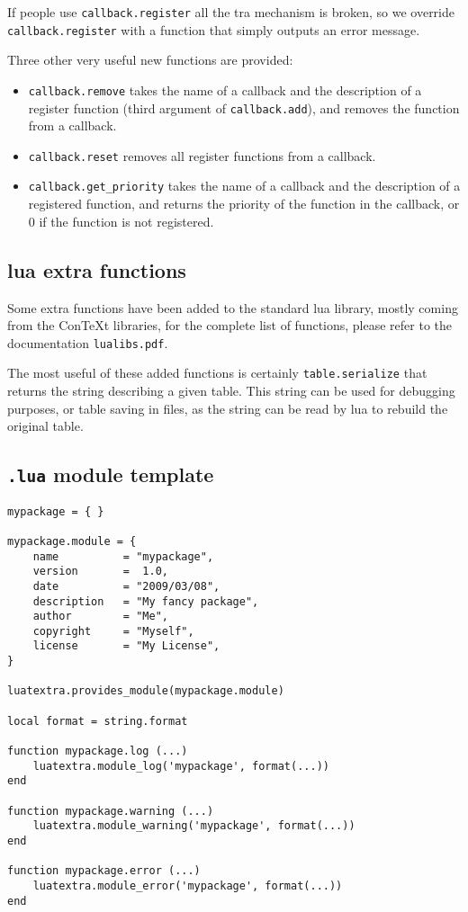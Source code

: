 \documentclass{article}
\begin{document}
If people use \texttt{callback.register} all the \LuaTeX tra mechanism is
broken, so we override \texttt{callback.register} with a function that simply
outputs an error message.

Three other very useful new functions are provided:

\begin{itemize}
  \item \texttt{callback.remove} takes the name of a callback and the
    description of a register function (third argument of
    \texttt{callback.add}), and removes the function from a callback.
  \item \texttt{callback.reset} removes all register functions from a
    callback.
  \item \texttt{callback.get\_priority} takes the name of a callback and the
    description of a registered function, and returns the priority of the
    function in the callback, or 0 if the function is not registered.
\end{itemize}

\subsection{lua extra functions}

Some extra functions have been added to the standard lua library, mostly
coming from the Con\TeX t libraries, for the complete list of functions,
please refer to the documentation \texttt{lualibs.pdf}.

The most useful of these added functions is certainly \texttt{table.serialize}
that returns the string describing a given table. This string can be used for
debugging purposes, or table saving in files, as the string can be read by lua
to rebuild the original table.

\subsection{\texttt{.lua} module template\label{sub:luatemplate}}

\begin{verbatim}
mypackage = { }

mypackage.module = {
    name          = "mypackage",
    version       =  1.0,
    date          = "2009/03/08",
    description   = "My fancy package",
    author        = "Me",
    copyright     = "Myself",
    license       = "My License",
}

luatextra.provides_module(mypackage.module)

local format = string.format

function mypackage.log (...)
    luatextra.module_log('mypackage', format(...))
end

function mypackage.warning (...)
    luatextra.module_warning('mypackage', format(...))
end

function mypackage.error (...)
    luatextra.module_error('mypackage', format(...))
end
\end{verbatim}
\end{document}
